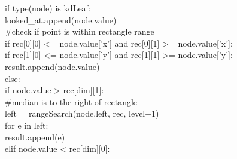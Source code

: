 \documentclass[english, fontsize=12pt, paper=a4, twoside=false, draft=true, pagesize=auto, version=last, DIV=16]{scrartcl}
\theoremstyle{break}
\begin{document}
\hspace*{10mm}if type(node) is kdLeaf:\\
\hspace*{10mm}\hspace*{10mm}looked\_at.append(node.value)\\
\hspace*{10mm}\hspace*{10mm}\#check if point is within rectangle range\\
\hspace*{10mm}\hspace*{10mm}if rec[0][0] <= node.value['x'] and rec[0][1] >= node.value['x']:\\
\hspace*{10mm}\hspace*{10mm\hspace*{10mm}}if rec[1][0] <= node.value['y'] and rec[1][1] >= node.value['y']:\\
\hspace*{10mm}\hspace*{10mm}\hspace*{10mm}\hspace*{10mm}result.append(node.value)\\
\hspace*{10mm}else:\\
\hspace*{10mm}\hspace*{10mm}if node.value > rec[dim][1]:\\
\hspace*{10mm}\hspace*{10mm}\hspace*{10mm}\#median is to the right of rectangle\\
\hspace*{10mm}\hspace*{10mm}\hspace*{10mm}left = rangeSearch(node.left, rec, level+1)\\
\hspace*{10mm}\hspace*{10mm}\hspace*{10mm}for e in left:\\
\hspace*{10mm}\hspace*{10mm}\hspace*{10mm}\hspace*{10mm}result.append(e)\\
\hspace*{10mm}\hspace*{10mm}elif node.value < rec[dim][0]:\\
\end{document}
